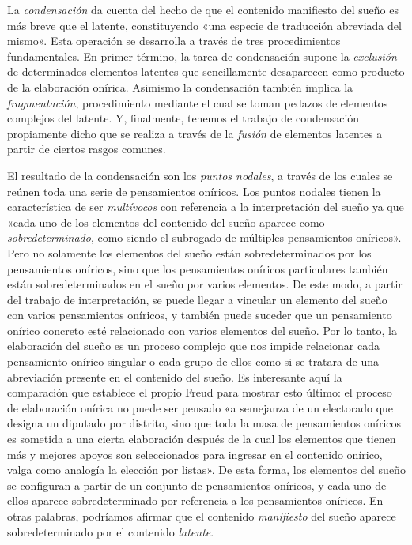 La \emph{condensación} da cuenta del hecho de que el contenido manifiesto del sueño es más breve que el latente, constituyendo «una especie de traducción abreviada del mismo». Esta operación se desarrolla a través de tres procedimientos fundamentales. En primer término, la tarea de condensación supone la \emph{exclusión} de determinados elementos latentes que sencillamente desaparecen como producto de la elaboración onírica. Asimismo la condensación también implica la \emph{fragmentación}, procedimiento mediante el cual se toman pedazos de elementos complejos del latente. Y, finalmente, tenemos el trabajo de condensación propiamente dicho que se realiza a través de la \emph{fusión} de elementos latentes a partir de ciertos rasgos comunes.

El resultado de la condensación son los \emph{puntos nodales}, a través de los cuales se reúnen toda una serie de pensamientos oníricos. Los puntos nodales tienen la característica de ser \emph{multívocos} con referencia a la interpretación del sueño ya que «cada uno de los elementos del contenido del sueño aparece como \emph{sobredeterminado}, como siendo el subrogado de múltiples pensamientos oníricos». Pero no solamente los elementos del sueño están sobredeterminados por los pensamientos oníricos, sino que los pensamientos oníricos particulares también están sobredeterminados en el sueño por varios elementos. De este modo, a partir del trabajo de interpretación, se puede llegar a vincular un elemento del sueño con varios pensamientos oníricos, y también puede suceder que un pensamiento onírico concreto esté relacionado con varios elementos del sueño. Por lo tanto, la elaboración del sueño es un proceso complejo que nos impide relacionar cada pensamiento onírico singular o cada grupo de ellos como si se tratara de una abreviación presente en el contenido del sueño. Es interesante aquí la comparación que establece el propio Freud para mostrar esto último: el proceso de elaboración onírica no puede ser pensado «a semejanza de un electorado que designa un diputado por distrito, sino que toda la masa de pensamientos oníricos es sometida a una cierta elaboración después de la cual los elementos que tienen más y mejores apoyos son seleccionados para ingresar en el contenido onírico, valga como analogía la elección por listas». De esta forma, los elementos del sueño se configuran a partir de un conjunto de pensamientos oníricos, y cada uno de ellos aparece sobredeterminado por referencia a los pensamientos oníricos. En otras palabras, podríamos afirmar que el contenido \emph{manifiesto} del sueño aparece sobredeterminado por el contenido \emph{latente}.

